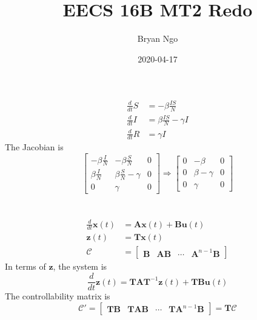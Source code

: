 \documentclass[]{article}
\title{EECS 16B MT2 Redo}
\author{Bryan Ngo}
\date{2020-04-17}
\newcommand{\diff}[1]{\frac{d}{d #1}}
\begin{document}
\maketitle

\section{}

\begin{align}
	\diff{t}S &= -\beta \frac{IS}{N} \\
	\diff{t}I &= \beta \frac{IS}{N} - \gamma I \\
	\diff{t}R &= \gamma I
\end{align}
The Jacobian is
\begin{equation}
	\begin{bmatrix}
	-\beta \frac{I}{N} & -\beta \frac{S}{N} & 0 \\
	\beta \frac{I}{N} & \beta \frac{S}{N} - \gamma & 0 \\
	0 & \gamma & 0
	\end{bmatrix} \Longrightarrow
	\begin{bmatrix}
	0 & -\beta & 0 \\
	0 & \beta - \gamma & 0 \\
	0 & \gamma & 0
	\end{bmatrix}
\end{equation}

\section{}

\begin{align}
	\diff{t} \bm{x}(t) &= \bm{Ax}(t) + \bm{Bu}(t) \\
	\bm{z}(t) &= \bm{Tx}(t) \\
	\bm{\mathcal{C}} &=
	\begin{bmatrix}
	\bm{B} & \bm{AB} & \cdots & \bm{A}^{n - 1} \bm{B}
	\end{bmatrix}
\end{align}
In terms of \(\bm{z}\), the system is
\begin{equation}
	\diff{t} \bm{z}(t) = \bm{TAT}^{-1} \bm{z}(t) + \bm{TBu}(t)
\end{equation}
The controllability matrix is
\begin{equation}
	\bm{\mathcal{C}}' =
	\begin{bmatrix}
	\bm{TB} & \bm{TAB} & \cdots & \bm{TA}^{n - 1}\bm{B}
	\end{bmatrix} = \bm{T\mathcal{C}}
\end{equation}
\end{document}
